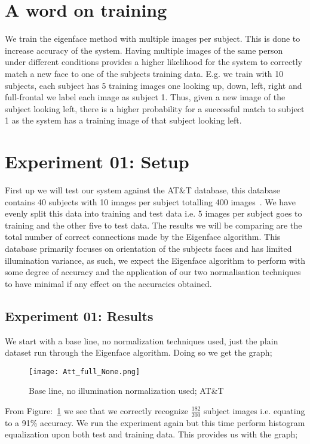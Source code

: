 \newpage
\section{A word on training}
We train the eigenface method with multiple images per subject.  This is done to increase accuracy of the system.  Having 
multiple images of the same person under different conditions provides a higher likelihood for the system to correctly match 
a new face to one of the subjects training data.  E.g. we train with 10 subjects, each subject has 5 training images one 
looking up, down, left, right and full-frontal we label each image as subject 1.  Thus, given a new image of the subject 
looking left, there is a higher probability for a successful match to subject 1 as the system has a training image of that 
subject looking left.

\section{Experiment 01: Setup}
First up we will test our system against the AT\&T database, this database contains 40 subjects with 10 images per subject 
totalling 400 images~\cite{ATTDATA}.  We have evenly split this data into training and test data i.e. 5 images per subject goes to 
training and the other five to test data.   The results we will be comparing are the total number of correct connections 
made by the Eigenface algorithm.  This database primarily focuses on orientation of the subjects faces and has limited 
illumination variance, as such, we expect the Eigenface algorithm to perform with some degree of accuracy and the application 
of our two normalisation techniques to have minimal if any effect on the accuracies obtained. 

\subsection{Experiment 01: Results}
We start with a base line, no normalization techniques used, just the plain dataset run through the 
Eigenface algorithm.  Doing so we get the graph;

	\begin{figure}[H]
		\centering
		\caption{Base line, no illumination normalization used; AT\&T \label{fig:Att_BaseLine}}
		\texttt{[image: Att\_full\_None.png]}
	\end{figure}

From Figure:~\ref{fig:Att_BaseLine} we see that we correctly recognize $\frac{182}{200}$ subject images i.e. equating to a 
91\% accuracy.  We run the experiment again but this time perform histogram equalization upon both test and training data.  
This provides us with the graph; 

